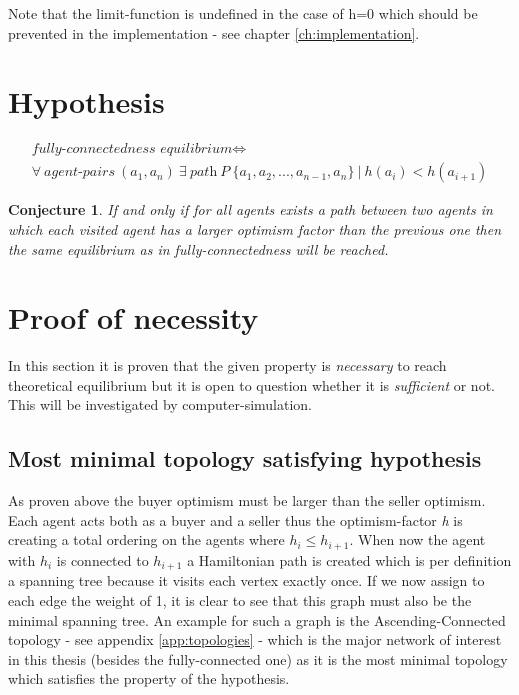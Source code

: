 \documentclass[Bachelorarbeit.tex]{subfiles}
\begin{document}
Note that the limit-function is undefined in the case of h=0 which should be prevented in the implementation - see chapter \ref{ch:implementation}.

\section{Hypothesis}
\begin{equation}
\begin{split}
\textit{fully-connectedness equilibrium} \iff \\
\forall \: \textit{agent-pairs} \: (a_{1},a_{n}) \: \exists \:  \textit{path} \: P \: \{a_{1}, a_{2}, ... , a_{n-1}, a_{n}\} \: | \: h(a_{i}) < h(a_{i+1})
\end{split}
\end{equation}

\newtheorem{conj}{Conjecture}
\begin{conj}
If and only if for all agents exists a path between two agents in which each visited agent has a larger optimism factor than the previous one then the same equilibrium as in fully-connectedness will be reached.
\end{conj}

\section{Proof of necessity}
In this section it is proven that the given property is \textit{necessary} to reach theoretical equilibrium but it is open to question whether it is \textit{sufficient} or not. This will be investigated by computer-simulation.

\subsection{Most minimal topology satisfying hypothesis}
As proven above the buyer optimism must be larger than the seller optimism. Each agent acts both as a buyer and a seller thus the optimism-factor \textit{h} is creating a total ordering on the agents where $h_i \leq h_{i+1}$. When now the agent with $h_i$ is connected to $h_{i+1}$ a Hamiltonian path is created which is per definition a spanning tree because it visits each vertex exactly once. If we now assign to each edge the weight of 1, it is clear to see that this graph must also be the minimal spanning tree. An example for such a graph is the Ascending-Connected topology - see appendix \ref{app:topologies} - which is the major network of interest in this thesis (besides the fully-connected one) as it is the most minimal topology which satisfies the property of the hypothesis.
\end{document}
